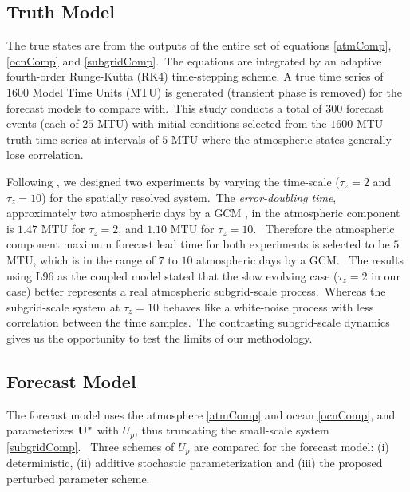 	\subsection{Truth Model} 
	
		The true states are from the outputs of the entire set of 
		equations \eqref{atmComp}, \eqref{ocnComp} and \eqref{subgridComp}.\
		The equations are integrated by an adaptive 
		fourth-order Runge-Kutta (RK4) time-stepping scheme.
		A true time series of $1600$ Model Time Units (MTU) is generated
		(transient phase is removed) for the forecast models to compare with.\
		This study conducts a total of 300 forecast events (each of $25$ MTU) 
		with initial conditions selected from the $1600$ MTU truth time series at
		intervals of $5$ MTU where the atmospheric states generally lose correlation.\


		Following {\citet{Arnold13}}, we designed 
		two experiments by varying the time-scale 
		($\tau_z=2$ and $\tau_z=10$) for the spatially resolved system.\
		The \emph{error-doubling time}, approximately two atmospheric days by a GCM {\citep{Lorenz96}}, 
		in the atmospheric component is $1.47$ MTU for $\tau_z=2$, 
		and $1.10$ MTU for $\tau_z=10$.\ %
		Therefore the atmospheric component maximum forecast lead time for both experiments
		is selected to be $5$ MTU, which is in the range of $7$ to $10$ atmospheric days by a GCM.\
		The results using L96 as the coupled model {\citep{Wilks05, Arnold13}}
		stated that the slow evolving case ($\tau_z=2$ in our case) better represents a
		real atmospheric subgrid-scale process.\
		Whereas the subgrid-scale system at $\tau_z=10$ behaves like a white-noise process
		with less correlation between the time samples.\
		The contrasting subgrid-scale dynamics gives us the opportunity 
		to test the limits of our methodology.\

		
	\subsection{Forecast Model} 
		The forecast model uses the atmosphere \eqref{atmComp} and ocean \eqref{ocnComp},
		and parameterizes $\bold{U^*}$ with $U_p$, thus 
		truncating the small-scale system \eqref{subgridComp}.\
		Three schemes of $U_p$ are compared for the forecast model:
		(i) deterministic, (ii) additive stochastic parameterization and
		(iii) the proposed perturbed parameter scheme.\

